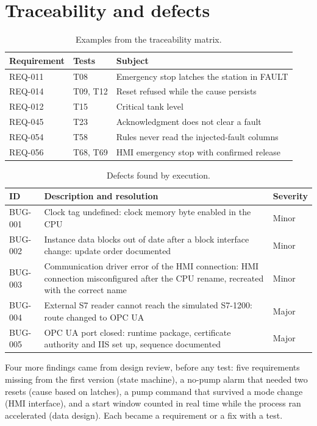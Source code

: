 \documentclass[11pt,a4paper]{report}
\begin{document}
	\section{Traceability and defects}
	
	\begin{table}[H]\centering\small
		\begin{tabularx}{\linewidth}{|l|l|Y|}
			\hline
			Requirement & Tests & Subject \\
			\hline
			REQ-011 & T08 & Emergency stop latches the station in FAULT \\
			REQ-014 & T09, T12 & Reset refused while the cause persists \\
			REQ-012 & T15 & Critical tank level \\
			REQ-045 & T23 & Acknowledgment does not clear a fault \\
			REQ-054 & T58 & Rules never read the injected-fault columns \\
			REQ-056 & T68, T69 & HMI emergency stop with confirmed release \\
			\hline
		\end{tabularx}
		\caption{Examples from the traceability matrix.}\label{tab:trace}
	\end{table}
	
	\begin{table}[H]\centering\small
		\begin{tabularx}{\linewidth}{|l|Y|l|}
			\hline
			ID & Description and resolution & Severity \\
			\hline
			BUG-001 & Clock tag undefined: clock memory byte enabled in the CPU & Minor \\
			BUG-002 & Instance data blocks out of date after a block interface change: update order documented & Minor \\
			BUG-003 & Communication driver error of the HMI connection: HMI connection misconfigured after the CPU rename, recreated with the correct name & Minor \\
			BUG-004 & External S7 reader cannot reach the simulated S7-1200: route changed to OPC UA & Major \\
			BUG-005 & OPC UA port closed: runtime package, certificate authority and IIS set up, sequence documented & Major \\
			\hline
		\end{tabularx}
		\caption{Defects found by execution.}\label{tab:defects}
	\end{table}
	
	Four more findings came from design review, before any test: five requirements missing from the first version (state machine), a no-pump alarm that needed two resets (cause based on latches), a pump command that survived a mode change (HMI interface), and a start window counted in real time while the process ran accelerated (data design). Each became a requirement or a fix with a test.
	
\end{document}
